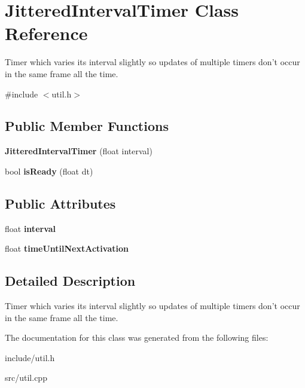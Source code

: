 \hypertarget{classJitteredIntervalTimer}{
\section{\-Jittered\-Interval\-Timer \-Class \-Reference}
\label{d7/d76/classJitteredIntervalTimer}
}


\-Timer which varies its interval slightly so updates of multiple timers don't occur in the same frame all the time.  




{\ttfamily \#include $<$util.\-h$>$}

\subsection*{\-Public \-Member \-Functions}
\begin{DoxyCompactItemize}
\item 
\hypertarget{classJitteredIntervalTimer_a13dd7b18953ffd42ca6cb761478916a8}{
{\bfseries \-Jittered\-Interval\-Timer} (float interval)}
\label{d7/d76/classJitteredIntervalTimer_a13dd7b18953ffd42ca6cb761478916a8}

\item 
\hypertarget{classJitteredIntervalTimer_a20f3345c14f5d4aedf8294d050dce039}{
bool {\bfseries is\-Ready} (float dt)}
\label{d7/d76/classJitteredIntervalTimer_a20f3345c14f5d4aedf8294d050dce039}

\end{DoxyCompactItemize}
\subsection*{\-Public \-Attributes}
\begin{DoxyCompactItemize}
\item 
\hypertarget{classJitteredIntervalTimer_a85c2aa44f5308781481a5fc08f62fcd6}{
float {\bfseries interval}}
\label{d7/d76/classJitteredIntervalTimer_a85c2aa44f5308781481a5fc08f62fcd6}

\item 
\hypertarget{classJitteredIntervalTimer_a186e24823d9ab20c87c2ec5d25ffdcc5}{
float {\bfseries time\-Until\-Next\-Activation}}
\label{d7/d76/classJitteredIntervalTimer_a186e24823d9ab20c87c2ec5d25ffdcc5}

\end{DoxyCompactItemize}


\subsection{\-Detailed \-Description}
\-Timer which varies its interval slightly so updates of multiple timers don't occur in the same frame all the time. 

\-The documentation for this class was generated from the following files\-:\begin{DoxyCompactItemize}
\item 
include/util.\-h\item 
src/util.\-cpp\end{DoxyCompactItemize}
